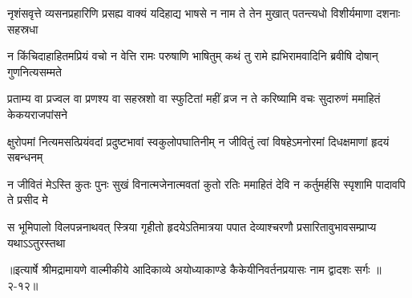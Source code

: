 \twolineshloka
{नृशंसवृत्ते व्यसनप्रहारिणि प्रसह्य वाक्यं यदिहाद्य भाषसे}
{न नाम ते तेन मुखात् पतन्त्यधो विशीर्यमाणा दशनाः सहस्रधा} %

\twolineshloka
{न किंचिदाहाहितमप्रियं वचो न वेत्ति रामः परुषाणि भाषितुम्}
{कथं तु रामे ह्यभिरामवादिनि ब्रवीषि दोषान् गुणनित्यसम्मते} %

\twolineshloka
{प्रताम्य वा प्रज्वल वा प्रणश्य वा सहस्रशो वा स्फुटितां महीं व्रज}
{न ते करिष्यामि वचः सुदारुणं ममाहितं केकयराजपांसने} %

\twolineshloka
{क्षुरोपमां नित्यमसत्प्रियंवदां प्रदुष्टभावां स्वकुलोपघातिनीम्}
{न जीवितुं त्वां विषहेऽमनोरमां दिधक्षमाणां हृदयं सबन्धनम्} %

\twolineshloka
{न जीवितं मेऽस्ति कुतः पुनः सुखं विनात्मजेनात्मवतां कुतो रतिः}
{ममाहितं देवि न कर्तुमर्हसि स्पृशामि पादावपि ते प्रसीद मे} %

\twolineshloka
{स भूमिपालो विलपन्ननाथवत् स्त्रिया गृहीतो हृदयेऽतिमात्रया}
{पपात देव्याश्चरणौ प्रसारितावुभावसम्प्राप्य यथाऽऽतुरस्तथा} %


॥इत्यार्षे श्रीमद्रामायणे वाल्मीकीये आदिकाव्ये अयोध्याकाण्डे कैकेयीनिवर्तनप्रयासः नाम द्वादशः सर्गः ॥२-१२॥
